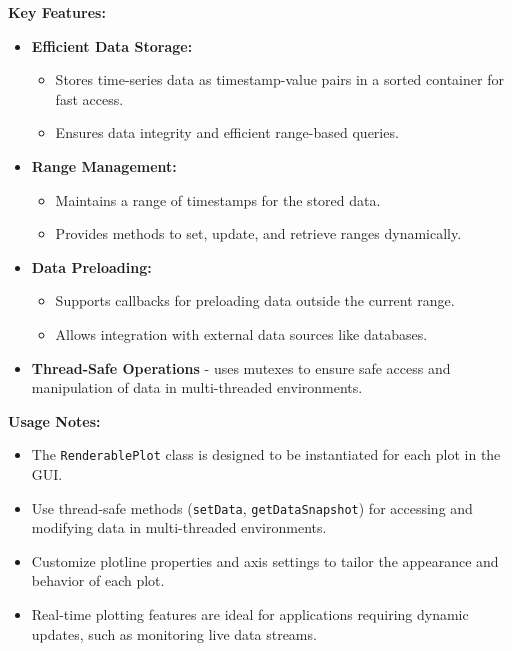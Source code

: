 \documentclass{article}
\begin{document}
\vspace{5pt}
\noindent
\textbf{Key Features:}
\begin{itemize}
    \item \textbf{Efficient Data Storage:}
    \begin{itemize}
        \item Stores time-series data as timestamp-value pairs in a sorted container for fast access.

        \item Ensures data integrity and efficient range-based queries.
    \end{itemize}
    
    \item \textbf{Range Management:}
    \begin{itemize}
        \item Maintains a range of timestamps for the stored data.

        \item Provides methods to set, update, and retrieve ranges dynamically.
    \end{itemize}
    
    \item \textbf{Data Preloading:}
    \begin{itemize}
        \item Supports callbacks for preloading data outside the current range.

        \item Allows integration with external data sources like databases.
    \end{itemize}

    \item \textbf{Thread-Safe Operations} - uses mutexes to ensure safe access and manipulation of data in multi-threaded environments.
\end{itemize}

\vspace{5pt}
\noindent
\textbf{Usage Notes:}
\begin{itemize}
    \item The \texttt{RenderablePlot} class is designed to be instantiated for each plot in the GUI.

    \item Use thread-safe methods (\texttt{setData}, \texttt{getDataSnapshot}) for accessing and modifying data in multi-threaded environments.

    \item Customize plotline properties and axis settings to tailor the appearance and behavior of each plot.

    \item Real-time plotting features are ideal for applications requiring dynamic updates, such as monitoring live data streams.
\end{itemize}
\end{document}
